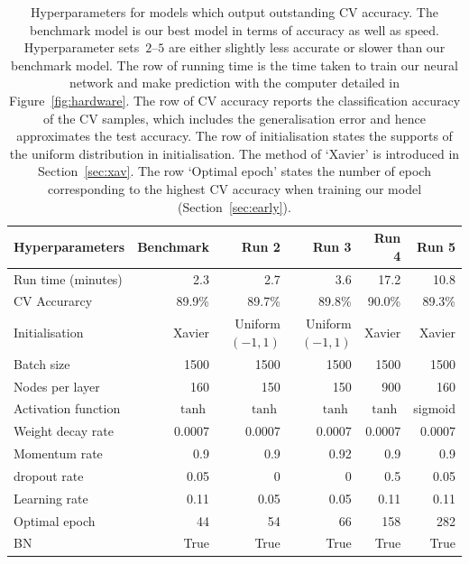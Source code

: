 \begin{table}
\caption{Hyperparameters for models which output outstanding CV accuracy. The benchmark model is our best model in terms of accuracy as well as speed. Hyperparameter sets~$2$--$5$ are either slightly less accurate or slower than our benchmark model. The row of running time is the time taken to train our neural network and make prediction with the computer detailed in Figure~\ref{fig:hardware}. The row of CV accuracy reports the classification accuracy of the CV samples, which includes the generalisation error and hence approximates the test accuracy. The row of initialisation states the supports of the uniform distribution in initialisation. The method of `Xavier' is introduced in Section~\ref{sec:xav}. The row `Optimal epoch' states the number of epoch corresponding to the highest CV accuracy when training our model (Section~\ref{sec:early}). \label{table:best-four-steps}}
\centering
{
\begin{tabular}{@{}lrrrrr@{}}
\toprule
Hyperparameters                & Benchmark  & Run 2           & Run 3           & Run 4  & Run 5  \\ \midrule
Run time (minutes)             & 2.3     & 2.7              & 3.6              & 17.2    & 10.8    \\
CV Accurarcy                 & 89.9\%  & 89.7\%           & 89.8\%           & 90.0\%  & 89.3\%  \\ \midrule
Initialisation            & Xavier  & \parbox[t]{1.3cm}{\raggedleft Uniform\\$(-1,1)$} 
& \parbox[t]{1.3cm}{\raggedleft Uniform\\$(-1,1)$} 
                                                                            & Xavier  & Xavier  \\
Batch size                & 1500    & 1500             & 1500             & 1500    & 1500    \\
Nodes per layer         & 160     & 150              & 150              & 900     & 160     \\
Activation function       & $\tanh$ & $\tanh$          & $\tanh$          & $\tanh$ & sigmoid \\
Weight decay rate         & 0.0007  & 0.0007           & 0.0007           & 0.0007   & 0.0007   \\
Momentum rate             & 0.9     & 0.9              & 0.92             & 0.9     & 0.9     \\
dropout rate              & 0.05    &0              & 0              & 0.5     & 0.05    \\
Learning rate             & 0.11    & 0.05             & 0.05             & 0.11    & 0.11    \\
Optimal epoch & 44      & 54               & 66               & 158     & 282     \\ 
BN & True      & True          & True          & True       & True          \\\bottomrule
\end{tabular}
}
\end{table}

